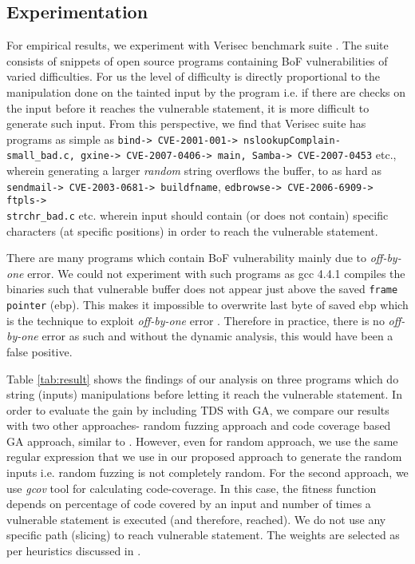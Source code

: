 \subsection{Experimentation}
For empirical results, we experiment with Verisec benchmark suite \cite{verisec08}. The suite consists of snippets of open source programs containing BoF vulnerabilities of varied difficulties. For us the level of difficulty is directly proportional to the manipulation done on the tainted input by the program i.e. if there are checks on the input before it reaches the vulnerable statement, it is more difficult to generate such input. From this perspective, we find that Verisec suite has programs as simple as \texttt{bind-> CVE-2001-001-> nslookupComplain-small\_bad.c, gxine-> CVE-2007-0406-> main, Samba-> CVE-2007-0453} etc., wherein generating a larger \emph{random} string overflows the buffer, to as hard as \texttt{sendmail-> CVE-2003-0681-> buildfname}, \texttt{edbrowse-> CVE-2006-6909-> ftpls->\\ strchr\_bad.c} etc. wherein input should contain (or does not contain) specific characters (at specific positions) in order to reach the vulnerable statement. 

There are many programs which contain BoF vulnerability mainly due to \emph{off-by-one} error. We could not experiment with such programs as gcc 4.4.1 compiles the binaries such that vulnerable buffer does not appear just above the saved \texttt{frame pointer} (ebp). This makes it impossible to overwrite last byte of saved ebp which is the technique to exploit \emph{off-by-one} error \cite{klog_offByone99}. Therefore in practice, there is no \emph{off-by-one} error as such and without the dynamic analysis, this would have been a false positive. 

Table \ref{tab:result} shows the findings of our analysis on three programs which do string (inputs) manipulations before letting it reach the vulnerable statement. In order to evaluate the gain by including TDS with GA, we compare our results with two other approaches- random fuzzing approach and code coverage based GA approach, similar to \cite{Grosso_GAbof04}. However, even for random approach, we use the same regular expression that we use in our proposed approach to generate the random inputs i.e. random fuzzing is not completely random. For the second approach, we use \emph{gcov} tool for calculating code-coverage. In this case, the fitness function depends on percentage of code covered by an input and number of times a vulnerable statement is executed (and therefore, reached). We do not use any specific path (slicing) to reach vulnerable statement. The weights are selected as per heuristics discussed in \cite{Grosso_GAbof04}.


